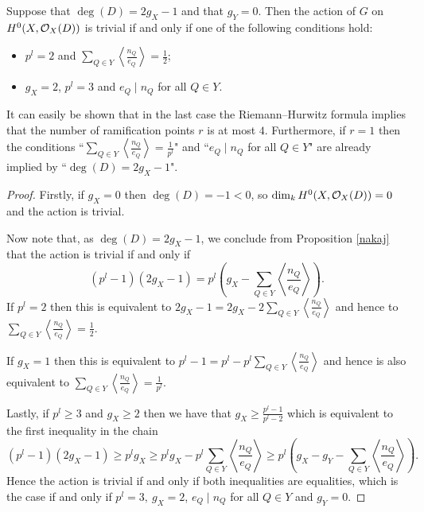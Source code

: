     \begin{cor}
    Suppose that $\deg(D)= 2g_X-1$ and that $g_Y=0$. Then the action of $G$ on $H^0(X,{\cal O}_X(D))$ is trivial if and only if one of the following conditions hold:
        \begin{itemize}
        \item  $p^l=2$ and $\sum_{Q\in Y}\left\langle\frac{n_Q}{e_Q}\right\rangle=\frac{1}{2}$;
        \item  $g_X=2$, $p^l=3$ and $e_Q\mid n_Q$ for all $Q\in Y$.
        \end{itemize}
    \end{cor}


    \begin{rem}
    It can easily be shown that in the last case the Riemann--Hurwitz formula implies that the number of ramification points $r$ is at most $4$. 
    Furthermore, if $r=1$ then the conditions ``$\sum_{Q\in Y}\left\langle\frac{n_Q}{e_Q}\right\rangle=\frac{1}{p^l}$" and ``$e_Q\mid n_Q$ for all $Q\in Y$" are already implied by ``$\deg(D)=2g_X-1$".
    \end{rem}

    \begin{proof}
    Firstly, if $g_X=0$ then $\deg(D)=-1<0$, so $\dim_kH^0(X,{\cal O}_X(D))=0$ and the action is trivial.
    
    Now note that, as $\deg(D)=2g_X-1$, we conclude from Proposition \ref{nakaj} that the action is trivial if and only if 
        \begin{equation*}
        (p^l-1)(2g_X-1)=p^l\left(g_X-\sum_{Q\in Y}\left\langle\frac{n_Q}{e_Q}\right\rangle\right).
        \end{equation*}
    If $p^l=2$ then this is equivalent to $2g_X-1=2g_X-2\sum_{Q\in Y}\left\langle\frac{n_Q}{e_Q}\right\rangle$ and hence to $\sum_{Q\in Y}\left\langle\frac{n_Q}{e_Q}\right\rangle=\frac{1}{2}$.
    
    If $g_X=1$ then this is equivalent to $p^l-1=p^l-p^l\sum_{Q\in Y}\left\langle\frac{n_Q}{e_Q}\right\rangle$ and hence is also equivalent to $\sum_{Q\in Y}\left\langle\frac{n_Q}{e_Q}\right\rangle=\frac{1}{p^l}$.
    
    Lastly, if $p^l\geq 3$ and $g_X\geq 2$ then we have that $g_X\geq \frac{p^l-1}{p^l-2}$ which is equivalent to the first inequality in the chain
        \begin{equation*}
        (p^l-1)(2g_X-1)\geq p^lg_X\geq p^lg_X-p^l\sum_{Q\in Y}\left\langle\frac{n_Q}{e_Q}\right\rangle \geq p^l\left( g_X - g_Y -\sum_{Q\in Y} \left\langle \frac{n_Q}{e_Q} \right\rangle \right).
        \end{equation*}
    Hence the action is trivial if and only if both inequalities are equalities, which is the case if and only if $p^l=3,\ g_X=2$, $e_Q\mid n_Q$ for all $Q\in Y$ and $g_Y = 0$.
    \end{proof}


